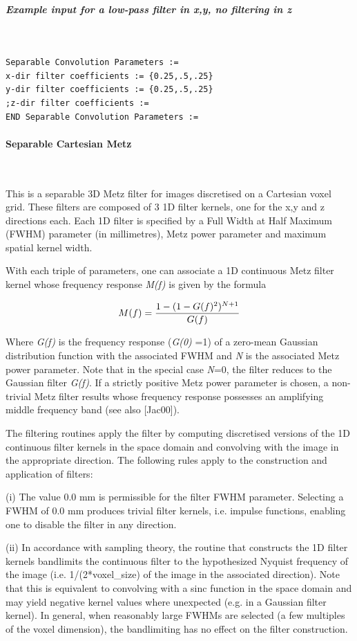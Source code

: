 \documentclass{article}
\newcommand{\subsubsubsection}[1]{\paragraph{#1}\mbox{} \\}
\newcommand{\subsubsubsubsection}[1]{\subparagraph{#1} \mbox{} \\}
\begin{document}
{{{ \subsubsubsubsection{Example input for a low-pass filter in x,y, no filtering 
in z}
}
\begin{verbatim}
Separable Convolution Parameters := 
x-dir filter coefficients := {0.25,.5,.25} 
y-dir filter coefficients := {0.25,.5,.25} 
;z-dir filter coefficients :=
END Separable Convolution Parameters :=
\end{verbatim}

{ \subsubsubsection{Separable Cartesian Metz}
}
This is a separable 3D Metz filter for images discretised on 
a Cartesian voxel grid. These filters are composed of 3 1D filter 
kernels, one for the x,y and z directions each. Each 1D filter 
is specified by a Full Width at Half Maximum (FWHM) parameter 
(in millimetres), Metz power parameter and maximum spatial kernel 
width. 



With each triple of parameters, one can associate a 1D continuous 
Metz filter kernel whose frequency response \textit{M(f)} is given 
by the formula

\[
M(f)=
{1-(1-G(f)^2)^{N+1}
\over
G(f)
}
\]

Where \textit{G(f)} is the frequency response (\textit{G(0)} =1) of a zero-mean 
Gaussian distribution function with the associated FWHM and \textit{N} 
is the associated Metz power parameter. Note that in the special 
case \textit{N}=0, the filter reduces to the Gaussian filter \textit{G(f)}. 
If a strictly positive Metz power parameter is chosen, a non-trivial 
Metz filter results whose frequency response possesses an amplifying 
middle frequency band (see also [Jac00]).



The filtering routines apply the filter by computing discretised 
versions of the 1D continuous filter kernels in the space domain 
and convolving with the image in the appropriate direction. The 
following rules apply to the construction and application of 
filters:



(i) The value 0.0 mm is permissible for the filter FWHM parameter. 
Selecting a FWHM of 0.0 mm produces trivial filter kernels, i.e. 
impulse functions, enabling one to disable the filter in any 
direction. 



(ii) In accordance with sampling theory, the routine that constructs 
the 1D filter kernels bandlimits the continuous filter to the 
hypothesized Nyquist frequency of the image (i.e. 1/(2*voxel\_size) 
of the image in the associated direction). Note that this is 
equivalent to convolving with a sinc function in the space domain 
and may yield negative kernel values where unexpected (e.g. in 
a Gaussian filter kernel). In general, when reasonably large 
FWHMs are selected (a few multiples of the voxel dimension), 
the bandlimiting has no effect on the filter construction.



}}
\end{document}
